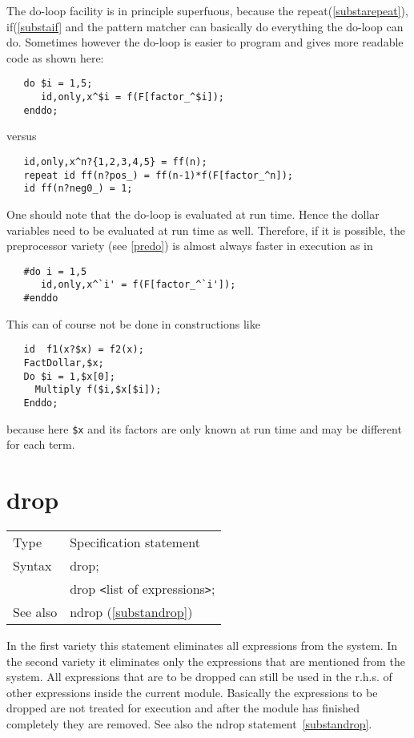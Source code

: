 \noindent The do-loop facility is in principle superfuous, because the 
repeat(\ref{substarepeat}), if(\ref{substaif} and the pattern matcher can 
basically do everything the do-loop can do. Sometimes however the do-loop 
is easier to program and gives more readable code as shown here:
\begin{verbatim}
   do $i = 1,5;
      id,only,x^$i = f(F[factor_^$i]);
   enddo;
\end{verbatim}
\noindent versus
\begin{verbatim}
   id,only,x^n?{1,2,3,4,5} = ff(n);
   repeat id ff(n?pos_) = ff(n-1)*f(F[factor_^n]);
   id ff(n?neg0_) = 1;
\end{verbatim}
\noindent One should note that the do-loop is evaluated at run time. Hence 
the dollar variables need to be evaluated at run time as well. Therefore, 
if it is possible, the preprocessor variety (see \ref{predo}) is almost 
always faster in execution as in
\begin{verbatim}
   #do i = 1,5
      id,only,x^`i' = f(F[factor_^`i']);
   #enddo
\end{verbatim}
\noindent This can of course not be done in constructions like
\begin{verbatim}
   id  f1(x?$x) = f2(x);
   FactDollar,$x;
   Do $i = 1,$x[0];
     Multiply f($i,$x[$i]);
   Enddo;
\end{verbatim}
\noindent because here \verb:$x: and its factors are only known at run time 
and may be different for each term.
\vspace{10mm}


\section{drop}
\label{substadrop}

\noindent \begin{tabular}{ll}
Type & Specification statement\\
Syntax & drop; \\
       & drop {\tt<}list of expressions{\tt>};
\\ See also & ndrop (\ref{substandrop})
\end{tabular} \vspace{4mm}

\noindent In the first variety this statement eliminates all 
expressions from the system. In the second variety it 
eliminates only the expressions that are mentioned from the system. All 
expressions that are to be dropped can still be used in the r.h.s. of other 
expressions inside the current module. Basically the expressions to be 
dropped are not treated for execution and after the module has finished 
completely they are removed. See also the ndrop 
statement~\ref{substandrop}. \vspace{10mm}

